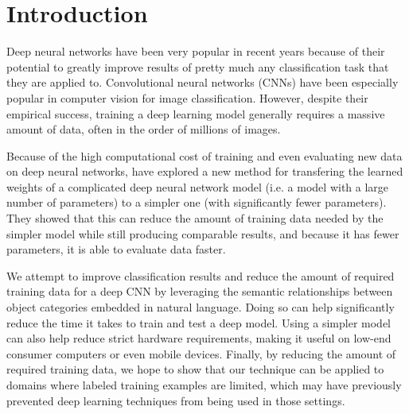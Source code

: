 \section{Introduction}

Deep neural networks have been very popular in recent years because of their
potential to greatly improve results of pretty much any classification task
that they are applied to.
Convolutional neural networks (CNNs) have been especially popular in computer
vision for image classification.
However, despite their empirical success, training a deep learning model
generally requires a massive amount of data, often in the order of millions of
images.

Because of the high computational cost of training and even evaluating new data
on deep neural networks, \cite{hinton2015distilling} have explored a new method
for transfering the learned weights of a complicated deep neural network model
(i.e. a model with a large number of parameters) to a simpler one (with
significantly fewer parameters). They showed that this can reduce the amount of
training data needed by the simpler model while still producing comparable
results, and because it has fewer parameters, it is able to evaluate data
faster.

We attempt to improve classification results and reduce the amount of required
training data for a deep CNN by leveraging the semantic relationships between
object categories embedded in natural language.
Doing so can help significantly reduce the time it takes to train and test a
deep model. Using a simpler model can also help reduce strict hardware
requirements, making it useful on low-end consumer computers or even mobile
devices.
Finally, by reducing the amount of required training data, we hope to show that
our technique can be applied to domains where labeled training examples are
limited, which may have previously prevented deep learning techniques from being
used in those settings.

